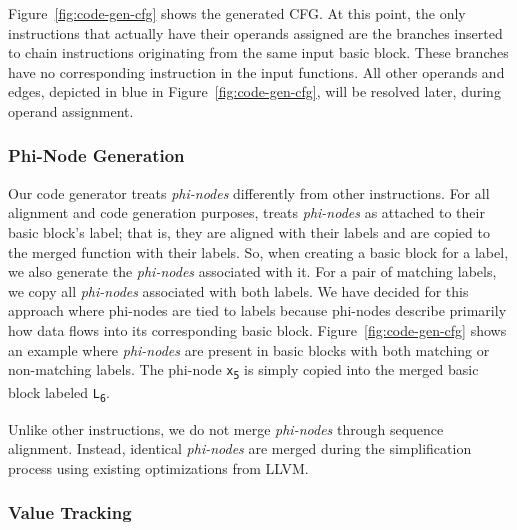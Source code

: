 Figure~\ref{fig:code-gen-cfg} shows the generated CFG. At this point, the only
instructions that actually have their operands assigned are the branches inserted
to chain instructions originating from the same input basic block.
These branches have no corresponding instruction in the input functions.
All other operands and edges, depicted in blue in Figure~\ref{fig:code-gen-cfg},
will be resolved later, during operand assignment.

\subsubsection{Phi-Node Generation}

Our code generator treats \textit{phi-nodes} differently from other instructions. For all alignment and code generation purposes,
{\ProjName} treats \textit{phi-nodes} as attached to their basic block's label; that is, they are aligned with their labels and are
copied to the merged function with their labels. So, when creating a basic block for a label, we also generate the \textit{phi-nodes}
associated with it. For a pair of matching labels, we copy all \textit{phi-nodes} associated with both labels.
We have decided for this approach where phi-nodes are tied to labels because phi-nodes describe primarily how data flows into its corresponding basic block.
Figure~\ref{fig:code-gen-cfg} shows an example where \textit{phi-nodes} are present in basic blocks
with both matching or non-matching labels.
The phi-node \texttt{x\textsubscript{5}} is simply copied into the merged basic block labeled \texttt{L\textsubscript{6}}.

Unlike other instructions, we do not merge \textit{phi-nodes} through sequence alignment.
Instead, identical \textit{phi-nodes} are merged during the simplification process
using existing optimizations from LLVM.

\subsubsection{Value Tracking}

